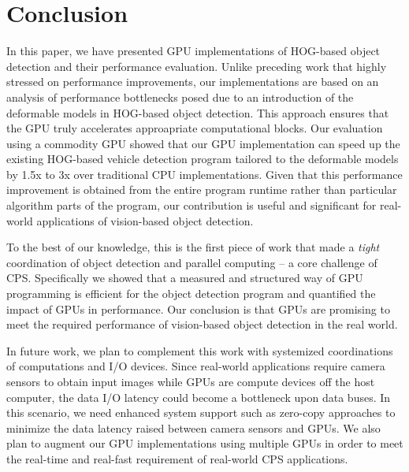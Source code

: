 \section{Conclusion}
\label{sec:conclusion}

In this paper, we have presented GPU implementations of HOG-based object
detection and their performance evaluation.
Unlike preceding work that highly stressed on performance improvements,
our implementations are based on an analysis of performance bottlenecks
posed due to an introduction of the deformable models in HOG-based
object detection.
This approach ensures that the GPU truly accelerates approapriate
computational blocks.
Our evaluation using a commodity GPU showed that our GPU implementation
can speed up the existing HOG-based vehicle detection program tailored
to the deformable models by 1.5x to 3x over traditional CPU
implementations.
Given that this performance improvement is obtained from the entire
program runtime rather than particular algorithm parts of the program,
our contribution is useful and significant for real-world applications
of vision-based object detection. 

To the best of our knowledge, this is the first piece of work that made
a \textit{tight} coordination of object detection and parallel computing
-- a core challenge of CPS.
Specifically we showed that a measured and structured way of GPU
programming is efficient for the object detection program and quantified
the impact of GPUs in performance.
Our conclusion is that GPUs are promising to meet the required
performance of vision-based object detection in the real world.

In future work, we plan to complement this work with systemized
coordinations of computations and I/O devices.
Since real-world applications require camera sensors to obtain input
images while GPUs are compute devices off the host computer, the data
I/O latency could become a bottleneck upon data buses.
In this scenario, we need enhanced system support such as zero-copy
approaches \cite{Kato13} to minimize the data latency raised between
camera sensors and GPUs.
We also plan to augment our GPU implementations using multiple GPUs in
order to meet the real-time and real-fast requirement of real-world CPS
applications.
